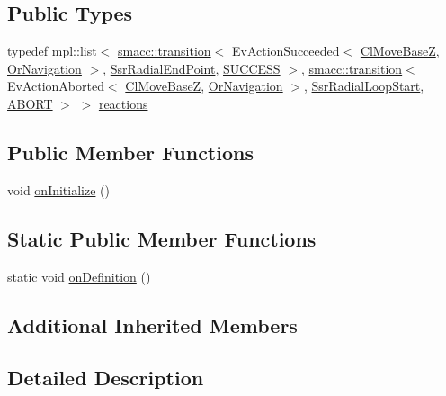 \subsection*{Public Types}
\begin{DoxyCompactItemize}
\item 
typedef mpl\+::list$<$ \hyperlink{classsmacc_1_1transition}{smacc\+::transition}$<$ Ev\+Action\+Succeeded$<$ \hyperlink{classmove__base__z__client_1_1ClMoveBaseZ}{Cl\+Move\+BaseZ}, \hyperlink{classsm__dance__bot_1_1OrNavigation}{Or\+Navigation} $>$, \hyperlink{structsm__dance__bot_1_1radial__motion__states_1_1SsrRadialEndPoint}{Ssr\+Radial\+End\+Point}, \hyperlink{classSUCCESS}{S\+U\+C\+C\+E\+SS} $>$, \hyperlink{classsmacc_1_1transition}{smacc\+::transition}$<$ Ev\+Action\+Aborted$<$ \hyperlink{classmove__base__z__client_1_1ClMoveBaseZ}{Cl\+Move\+BaseZ}, \hyperlink{classsm__dance__bot_1_1OrNavigation}{Or\+Navigation} $>$, \hyperlink{structsm__dance__bot_1_1radial__motion__states_1_1SsrRadialLoopStart}{Ssr\+Radial\+Loop\+Start}, \hyperlink{classABORT}{A\+B\+O\+RT} $>$ $>$ \hyperlink{structsm__dance__bot_1_1radial__motion__states_1_1SsrRadialRotate_a99d2bb1f19e5f90225e85c54c68ee070}{reactions}
\end{DoxyCompactItemize}
\subsection*{Public Member Functions}
\begin{DoxyCompactItemize}
\item 
void \hyperlink{structsm__dance__bot_1_1radial__motion__states_1_1SsrRadialRotate_ad04ad0c26c9d2bff70ff19b4dee71252}{on\+Initialize} ()
\end{DoxyCompactItemize}
\subsection*{Static Public Member Functions}
\begin{DoxyCompactItemize}
\item 
static void \hyperlink{structsm__dance__bot_1_1radial__motion__states_1_1SsrRadialRotate_afe95818cf995cfa8442caa15daf9a867}{on\+Definition} ()
\end{DoxyCompactItemize}
\subsection*{Additional Inherited Members}


\subsection{Detailed Description}


